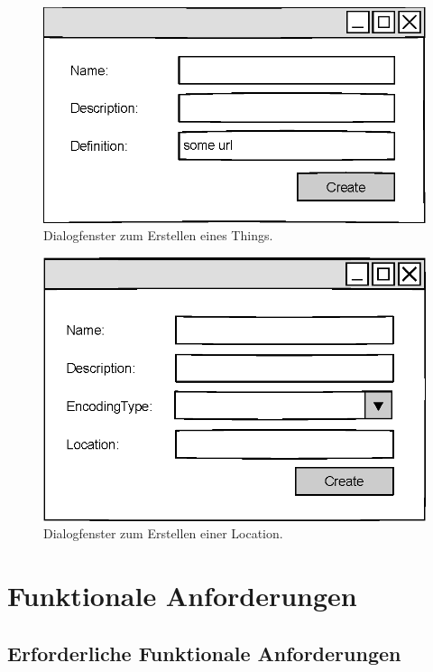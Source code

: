 \documentclass[a4paper, 12 pt]{article}
\begin{document}
\begin{figure}[htbp]
\centering
\includegraphics[scale=1]{images/oprop}
\caption{\label{fig:oprop}Dialogfenster zum Erstellen eines Things.}
\end{figure}

\begin{figure}[htbp]
\centering
\includegraphics[scale=1]{images/loc}
\caption{\label{fig:loc}Dialogfenster zum Erstellen einer Location.}
\end{figure}

\section{Funktionale Anforderungen}
\subsection{Erforderliche Funktionale Anforderungen}
	
\end{document}
